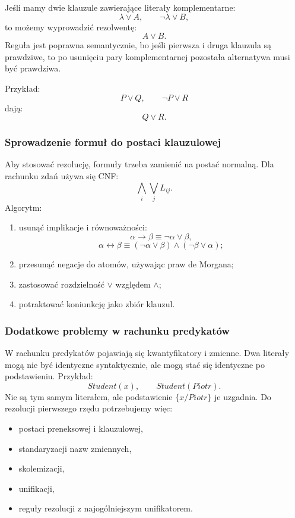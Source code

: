 Jeśli mamy dwie klauzule zawierające literały komplementarne:
\[
\lambda\vee A,\qquad \neg\lambda\vee B,
\]
to możemy wyprowadzić rezolwentę:
\[
A\vee B.
\]
Reguła jest poprawna semantycznie, bo jeśli pierwsza i druga klauzula są prawdziwe, to po usunięciu pary komplementarnej pozostała alternatywa musi być prawdziwa.

Przykład:
\[
P\vee Q,\qquad \neg P\vee R
\]
dają:
\[
Q\vee R.
\]

\subsubsection{Sprowadzenie formuł do postaci klauzulowej}

Aby stosować rezolucję, formuły trzeba zamienić na postać normalną. Dla rachunku zdań używa się CNF:
\[
\bigwedge_i \bigvee_j L_{ij}.
\]
Algorytm:
\begin{enumerate}
  \item usunąć implikacje i równoważności:
  \[
  \alpha\to\beta \equiv \neg\alpha\vee\beta,
  \]
  \[
  \alpha\leftrightarrow\beta \equiv (\neg\alpha\vee\beta)\wedge(\neg\beta\vee\alpha);
  \]
  \item przesunąć negacje do atomów, używając praw de Morgana;
  \item zastosować rozdzielność $\vee$ względem $\wedge$;
  \item potraktować koniunkcję jako zbiór klauzul.
\end{enumerate}

\subsubsection{Dodatkowe problemy w rachunku predykatów}

W rachunku predykatów pojawiają się kwantyfikatory i zmienne. Dwa literały mogą nie być identyczne syntaktycznie, ale mogą stać się identyczne po podstawieniu. Przykład:
\[
Student(x),\qquad Student(Piotr).
\]
Nie są tym samym literałem, ale podstawienie $\{x/Piotr\}$ je uzgadnia. Do rezolucji pierwszego rzędu potrzebujemy więc:
\begin{itemize}
  \item postaci preneksowej i klauzulowej,
  \item standaryzacji nazw zmiennych,
  \item skolemizacji,
  \item unifikacji,
  \item reguły rezolucji z najogólniejszym unifikatorem.
\end{itemize}

